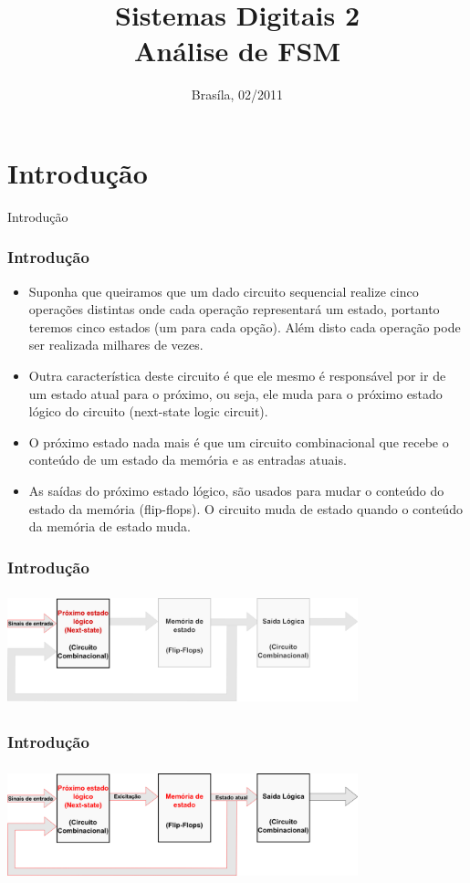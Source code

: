 \documentclass{beamer}
\title{Sistemas Digitais 2\\ \textbf{Análise de FSM}}
\date{Brasíla, 02/2011}
\institute{\textbf{Universidade de Brasília - Faculdade do Gama}}
\begin{document}
\begin{frame}
  \titlepage
\end{frame}
  
\section{Introdução}Introdução
  \begin{frame}
    \frametitle{Introdução}
    \begin{itemize}
      \item Suponha que queiramos que um dado circuito sequencial realize cinco operações distintas onde cada operação representará um estado, 
	    portanto teremos cinco estados (um para cada opção). Além disto cada operação pode ser realizada milhares de vezes. \pause
      \item Outra característica deste circuito é que ele mesmo é responsável por ir de um estado atual para o próximo, ou seja, ele muda para 
	    o próximo estado lógico do circuito (next-state logic circuit).\pause
      \item O próximo estado nada mais é que um circuito combinacional que recebe o conteúdo de um estado da memória e as entradas atuais.\pause
      \item As saídas do próximo estado lógico, são usados para mudar o conteúdo do estado da memória (flip-flops). O circuito muda de estado quando 
	    o conteúdo da memória de estado muda.
    \end{itemize}
  \end{frame}

  \begin{frame}
    \frametitle{Introdução}
    \includegraphics[height=1.3in, width=4in]{modelo_1.png}
  \end{frame}

  \begin{frame}
    \frametitle{Introdução}
    \includegraphics[height = 1.3in, width = 4in]{modelo_2.png}
  \end{frame}
\end{document}
